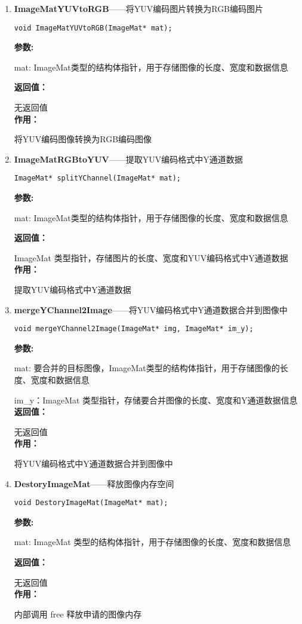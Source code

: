 \documentclass[12pt, a4paper, oneside]{ctexbook}
\begin{document}
\begin{enumerate}
			\item \textbf{ImageMatYUVtoRGB}——将YUV编码图片转换为RGB编码图片
				\begin{lstlisting}[numbers=none]
void ImageMatYUVtoRGB(ImageMat* mat);
				\end{lstlisting}
				\textbf{参数:} \par mat: ImageMat类型的结构体指针，用于存储图像的长度、宽度和数据信息\par 
				\textbf{返回值：}\par 无返回值 \\
				\textbf{作用：}\par  将YUV编码图像转换为RGB编码图像\\
			
			
			\item \textbf{ImageMatRGBtoYUV}——提取YUV编码格式中Y通道数据
				\begin{lstlisting}[numbers=none]
ImageMat* splitYChannel(ImageMat* mat);
				\end{lstlisting}
				\textbf{参数:} \par mat: ImageMat类型的结构体指针，用于存储图像的长度、宽度和数据信息\par 
				\textbf{返回值：}\par ImageMat 类型指针，存储图片的长度、宽度和YUV编码格式中Y通道数据 \\
				\textbf{作用：}\par 提取YUV编码格式中Y通道数据 \\

			\item \textbf{mergeYChannel2Image}——将YUV编码格式中Y通道数据合并到图像中
				\begin{lstlisting}[numbers=none]
void mergeYChannel2Image(ImageMat* img, ImageMat* im_y);
				\end{lstlisting}
				\textbf{参数:} \par mat: 要合并的目标图像，ImageMat类型的结构体指针，用于存储图像的长度、宽度和数据信息\par im\_y：ImageMat 类型指针，存储要合并图像的长度、宽度和Y通道数据信息 \\
				\textbf{返回值：}\par 无返回值 \\
				\textbf{作用：}\par 将YUV编码格式中Y通道数据合并到图像中 \\			

			\item \textbf{DestoryImageMat}——释放图像内存空间
				\begin{lstlisting}[numbers=none]
void DestoryImageMat(ImageMat* mat);
				\end{lstlisting}
				\textbf{参数:} \par mat: ImageMat 类型的结构体指针，用于存储图像的长度、宽度和数据信息\par 
				\textbf{返回值：}\par 无返回值 \\
				\textbf{作用：}\par 内部调用 free 释放申请的图像内存 \\			
							
			
		\end{enumerate}
		
\end{document}
